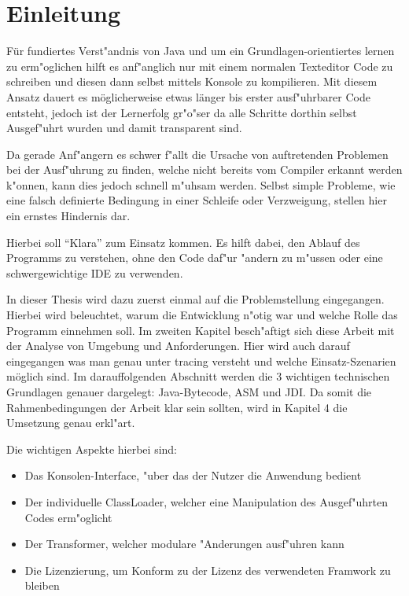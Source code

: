 
\chapter{Einleitung}

Für fundiertes Verst"andnis von Java und um ein Grundlagen-orientiertes lernen zu erm"oglichen hilft es anf"anglich nur mit einem normalen Texteditor Code zu schreiben und diesen dann selbst mittels Konsole zu kompilieren.
Mit diesem Ansatz dauert es möglicherweise etwas länger bis erster ausf"uhrbarer Code entsteht, jedoch ist der Lernerfolg gr"o"ser da alle Schritte dorthin selbst Ausgef"uhrt wurden und damit transparent sind.

Da gerade Anf"angern es schwer f"allt die Ursache von auftretenden Problemen bei der Ausf"uhrung zu finden, welche nicht bereits vom Compiler erkannt werden k"onnen, kann dies jedoch schnell m"uhsam werden. Selbst simple Probleme, wie eine falsch definierte Bedingung in einer Schleife oder Verzweigung, stellen hier ein ernstes Hindernis dar.

Hierbei soll "`Klara"' zum Einsatz kommen. Es hilft dabei, den Ablauf des Programms zu verstehen, ohne den Code daf"ur "andern zu m"ussen oder eine schwergewichtige \ac{IDE} zu verwenden.

In dieser Thesis wird dazu zuerst einmal auf die Problemstellung eingegangen. Hierbei wird beleuchtet, warum die Entwicklung n"otig war und welche Rolle das Programm einnehmen soll.
Im zweiten Kapitel besch"aftigt sich diese Arbeit mit der Analyse von Umgebung und Anforderungen. Hier wird auch darauf eingegangen was man genau unter tracing versteht und welche Einsatz-Szenarien möglich sind.
Im darauffolgenden Abschnitt werden die 3 wichtigen technischen Grundlagen genauer dargelegt: Java-Bytecode, ASM und \ac{JDI}.
Da somit die Rahmenbedingungen der Arbeit klar sein sollten, wird in Kapitel 4 die Umsetzung genau erkl"art.

Die wichtigen Aspekte hierbei sind:
\begin{itemize}
	\item Das Konsolen-Interface, "uber das der Nutzer die Anwendung bedient
	\item Der individuelle ClassLoader, welcher eine Manipulation des Ausgef"uhrten Codes erm"oglicht
	\item Der Transformer, welcher modulare "Anderungen ausf"uhren kann
	\item Die Lizenzierung, um Konform zu der Lizenz des verwendeten Framwork zu bleiben
\end{itemize}

